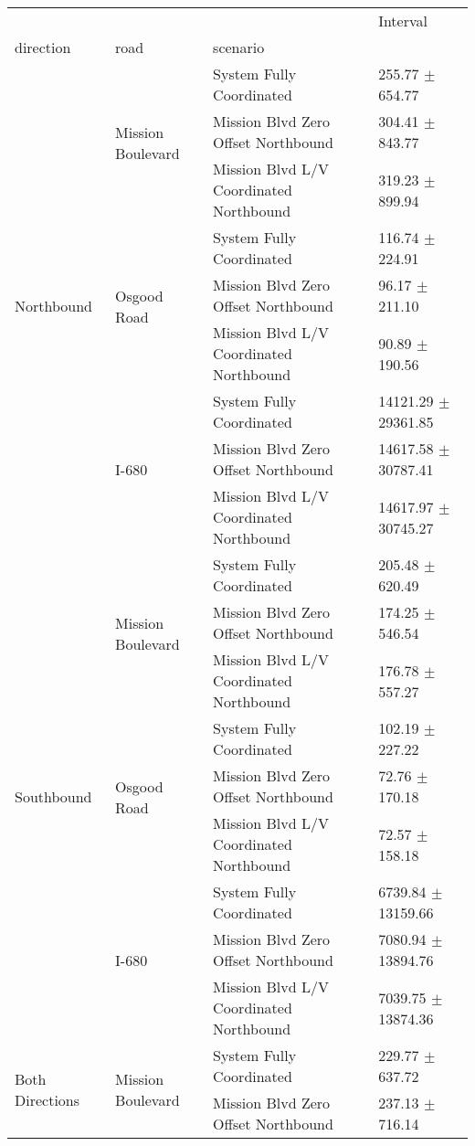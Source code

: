 \begin{tabular}{llll}
\toprule
 &  &  & Interval \\
direction & road & scenario &  \\
\midrule
\multirow[t]{9}{*}{Northbound} & \multirow[t]{3}{*}{Mission Boulevard} & System Fully Coordinated & 255.77 $\pm$ 654.77 \\
 &  & Mission Blvd Zero Offset Northbound & 304.41 $\pm$ 843.77 \\
 &  & Mission Blvd L/V Coordinated Northbound & 319.23 $\pm$ 899.94 \\
 & \multirow[t]{3}{*}{Osgood Road} & System Fully Coordinated & 116.74 $\pm$ 224.91 \\
 &  & Mission Blvd Zero Offset Northbound & 96.17 $\pm$ 211.10 \\
 &  & Mission Blvd L/V Coordinated Northbound & 90.89 $\pm$ 190.56 \\
 & \multirow[t]{3}{*}{I-680} & System Fully Coordinated & 14121.29 $\pm$ 29361.85 \\
 &  & Mission Blvd Zero Offset Northbound & 14617.58 $\pm$ 30787.41 \\
 &  & Mission Blvd L/V Coordinated Northbound & 14617.97 $\pm$ 30745.27 \\
\multirow[t]{9}{*}{Southbound} & \multirow[t]{3}{*}{Mission Boulevard} & System Fully Coordinated & 205.48 $\pm$ 620.49 \\
 &  & Mission Blvd Zero Offset Northbound & 174.25 $\pm$ 546.54 \\
 &  & Mission Blvd L/V Coordinated Northbound & 176.78 $\pm$ 557.27 \\
 & \multirow[t]{3}{*}{Osgood Road} & System Fully Coordinated & 102.19 $\pm$ 227.22 \\
 &  & Mission Blvd Zero Offset Northbound & 72.76 $\pm$ 170.18 \\
 &  & Mission Blvd L/V Coordinated Northbound & 72.57 $\pm$ 158.18 \\
 & \multirow[t]{3}{*}{I-680} & System Fully Coordinated & 6739.84 $\pm$ 13159.66 \\
 &  & Mission Blvd Zero Offset Northbound & 7080.94 $\pm$ 13894.76 \\
 &  & Mission Blvd L/V Coordinated Northbound & 7039.75 $\pm$ 13874.36 \\
\multirow[t]{9}{*}{Both Directions} & \multirow[t]{3}{*}{Mission Boulevard} & System Fully Coordinated & 229.77 $\pm$ 637.72 \\
 &  & Mission Blvd Zero Offset Northbound & 237.13 $\pm$ 716.14 \\

\end{tabular}
